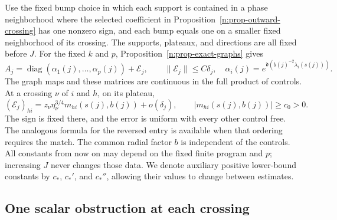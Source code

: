 Use the fixed bump choice in which each support is contained in a phase
neighborhood where the selected coefficient in
Proposition~\ref{n:prop-outward-crossing} has one nonzero sign, and each
bump equals one on a smaller fixed neighborhood of its crossing.  The
supports, plateaux, and directions are all fixed before \(J\).  For the
fixed \(k\) and \(p\), Proposition~\ref{n:prop-exact-graphs} gives
\begin{equation}
 A_j=\operatorname{diag}(\alpha_1(j),\ldots,\alpha_p(j))
          +\mathcal E_j,\qquad
 \|\mathcal E_j\|\leq C\delta_j,
 \quad
 \alpha_i(j)=e^{\mathfrak d(b(j)^{-2}\lambda_i(s(j)))}.
 \label{n:eq-matching-matrix}
\end{equation}
The graph maps and these matrices are continuous in the full product of
controls.  At a crossing \(\nu\) of \(i\) and \(h\), on its plateau,
\begin{equation}
 (\mathcal E_j)_{hi}
 =z_\nu\eta_\nu^{3/4}m_{hi}(s(j),b(j))+o(\delta_j),
 \qquad |m_{hi}(s(j),b(j))|\geq c_0>0.
 \label{n:eq-matching-offdiagonal}
\end{equation}
The sign is fixed there, and the error is uniform with every other control
free.  The analogous formula for the reversed entry is available when that
ordering requires the match.  The common radial factor \(b\) is independent
of the controls.  All constants from now on may depend on the fixed finite
program and \(p\); increasing \(J\) never changes those data.
We denote auxiliary positive lower-bound constants by \(c_*\),
\(c_*'\), and \(c_*''\), allowing their values to change between estimates.

\subsection{One scalar obstruction at each crossing}

